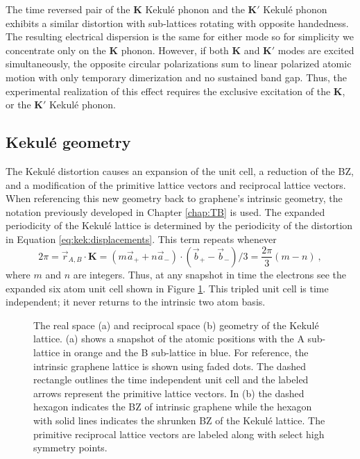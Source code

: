 The time reversed pair of the $\bm{K}$ Kekul\'e phonon and the $\bm{K'}$ Kekul\'e phonon exhibits a similar distortion with sub-lattices rotating with opposite handedness.
The resulting electrical dispersion is the same for either mode so for simplicity we concentrate only on the $\bm{K}$ phonon.
However, if both $\bm{K}$ and $\bm{K'}$ modes are excited simultaneously, the opposite circular polarizations sum to linear polarized atomic motion with only temporary dimerization and no sustained band gap.
Thus, the experimental realization of this effect requires the exclusive excitation of the $\bm{K}$, or the $\bm{K'}$ Kekul\'e phonon.

\subsection{Kekul\'e geometry}
The Kekul\'e distortion causes an expansion of the unit cell, a reduction of the BZ, and a modification of the primitive lattice vectors and reciprocal lattice vectors.
When referencing this new geometry back to graphene's intrinsic geometry, the notation previously developed in Chapter \ref{chap:TB} is used.
The expanded periodicity of the Kekul\'e lattice is determined by the periodicity of the distortion in Equation \ref{eq:kek:displacements}.
This term repeats whenever 
\begin{equation*}
	2 \pi=\vec{r}_{A,B} \cdot \bm{K}=(m \vec{a}_+ + n \vec{a}_-) \cdot (\vec{b}_+ - \vec{b}_-)/3=\frac{2 \pi}{3} (m-n) \ ,
\end{equation*}
where $m$ and $n$ are integers.
Thus, at any snapshot in time the electrons see the expanded six atom unit cell shown in Figure \ref{fig:kek:geometry}.
This tripled unit cell is time independent; it never returns to the intrinsic two atom basis. 

\begin{figure}
	\begin{center}
	
	\end{center}
	\caption[Geometry of the Kekul\'e lattice]{\label{fig:kek:geometry}
		The real space (a) and reciprocal space (b) geometry of the Kekul\'e lattice.
		(a) shows a snapshot of the atomic positions with the A sub-lattice in orange and the B sub-lattice in blue.	
		For reference, the intrinsic graphene lattice is shown using faded dots.
		The dashed rectangle outlines the time independent unit cell and the labeled arrows represent the primitive lattice vectors.
		In (b) the dashed hexagon indicates the BZ of intrinsic graphene while the hexagon with solid lines indicates the shrunken BZ of the Kekul\'e lattice.
		The primitive reciprocal lattice vectors are labeled along with select high symmetry points.
	}
\end{figure}

